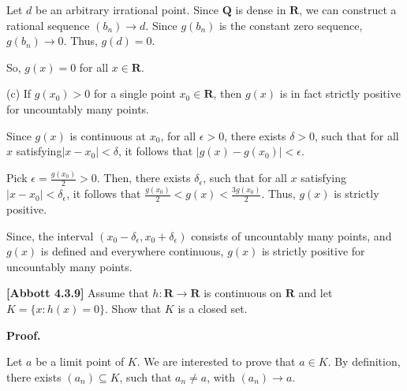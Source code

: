 \documentclass[10pt]{article}
\begin{document}
Let $\displaystyle d$ be an arbitrary irrational point. Since $\displaystyle \mathbf{Q}$ is dense in $\displaystyle \mathbf{R}$, we can construct a rational sequence $\displaystyle ( b_{n})\rightarrow d$. Since $\displaystyle g( b_{n})$ is the constant zero sequence, $\displaystyle g( b_{n})\rightarrow 0$. Thus, $\displaystyle g( d) =0$.



So, $\displaystyle g( x) =0$ for all $\displaystyle x\in \mathbf{R}$.



(c) If $\displaystyle g( x_{0})  >0$ for a single point $\displaystyle x_{0} \in \mathbf{R}$, then $\displaystyle g( x)$ is in fact strictly positive for uncountably many points. 



Since $\displaystyle g( x)$ is continuous at $\displaystyle x_{0}$, for all $\displaystyle \epsilon  >0$, there exists $\displaystyle \delta  >0$, such that for all $\displaystyle x$ satisfying$\displaystyle | x-x_{0}| < \delta $, it follows that $\displaystyle |g( x) -g( x_{0}) |< \epsilon $. 



Pick $\displaystyle \epsilon =\frac{g( x_{0})}{2}  >0$. Then, there exists $\displaystyle \delta _{\epsilon }$, such that for all $\displaystyle x$ satisfying $\displaystyle |x-x_{0} |< \delta _{\epsilon }$, it follows that $\displaystyle \frac{g( x_{0})}{2} < g( x) < \frac{3g( x_{0})}{2}$. Thus, $\displaystyle g( x)$ is strictly positive.



Since, the interval $\displaystyle ( x_{0} -\delta _{\epsilon } ,x_{0} +\delta _{\epsilon })$ consists of uncountably many points, and $\displaystyle g( x)$ is defined and everywhere continuous, $\displaystyle g( x)$ is strictly positive for uncountably many points.



\textbf{[Abbott 4.3.9]} Assume that $\displaystyle h:\mathbf{R}\rightarrow \mathbf{R}$ is continuous on $\displaystyle \mathbf{R}$ and let $\displaystyle K=\{x:h( x) =0\}$. Show that $\displaystyle K$ is a closed set.



\textbf{Proof.}



Let $\displaystyle a$ be a limit point of $\displaystyle K$. We are interested to prove that $\displaystyle a\in K$. By definition, there exists $\displaystyle ( a_{n}) \subseteq K$, such that $\displaystyle a_{n} \neq a$, with $\displaystyle ( a_{n})\rightarrow a$. 
\end{document}
